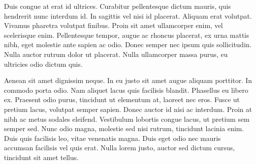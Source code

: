 \documentclass{article}
\begin{document}
Duis congue at erat id ultrices. Curabitur pellentesque dictum mauris, quis hendrerit nunc interdum id. In sagittis vel nisi id placerat. Aliquam erat volutpat. Vivamus pharetra volutpat finibus. Proin sit amet ullamcorper enim, vel scelerisque enim. Pellentesque tempor, augue ac rhoncus placerat, ex urna mattis nibh, eget molestie ante sapien ac odio. Donec semper nec ipsum quis sollicitudin. Nulla auctor rutrum dolor ut placerat. Nulla ullamcorper massa purus, eu ultricies odio dictum quis.

Aenean sit amet dignissim neque. In eu justo sit amet augue aliquam porttitor. In commodo porta odio. Nam aliquet lacus quis facilisis blandit. Phasellus eu libero ex. Praesent odio purus, tincidunt ut elementum at, laoreet nec eros. Fusce ut pretium lacus, volutpat semper sapien. Donec auctor id nisi ac interdum. Proin at nibh ac metus sodales eleifend. Vestibulum lobortis congue lacus, ut pretium sem semper sed. Nunc odio magna, molestie sed nisi rutrum, tincidunt lacinia enim. Duis quis facilisis leo, vitae venenatis magna. Duis eget odio nec mauris accumsan facilisis vel quis erat. Nulla lorem justo, auctor sed dictum cursus, tincidunt sit amet tellus.

\endnumbering
\end{document}
